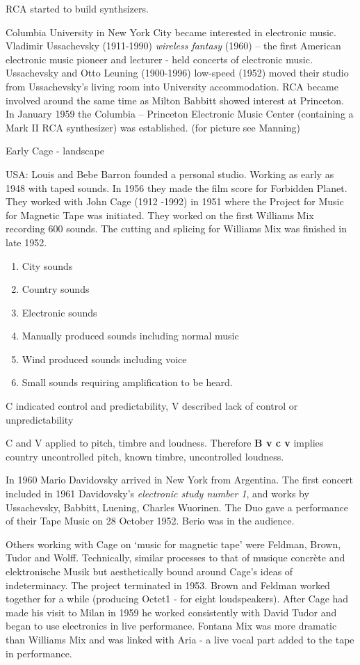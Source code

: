 RCA started to build synthsizers.

Columbia University in New York City became interested in electronic music. Vladimir Ussachevsky (1911-1990) \textit{wireless fantasy} (1960) – the first American electronic music pioneer and lecturer - held concerts of electronic music. Ussachevsky and Otto Leuning (1900-1996) low-speed (1952) moved their studio from Ussachevsky’s living room into University accommodation. RCA became involved around the same time as Milton Babbitt showed interest at Princeton. In January 1959 the Columbia – Princeton Electronic Music Center (containing a Mark II RCA synthesizer) was established. (for picture see Manning)

Early Cage - landscape

USA: Louis and Bebe Barron founded a personal studio. Working as early as 1948 with taped sounds. In 1956 they made the film score for Forbidden Planet. They worked with John Cage (1912 -1992) in 1951 where the Project for Music for Magnetic Tape was initiated. They worked on the first Williams Mix recording 600 sounds. The cutting and splicing for Williams Mix was finished in late 1952.
\begin{enumerate}[a]
\item City sounds
\item Country sounds
\item Electronic sounds
\item Manually produced sounds including normal music
\item Wind produced sounds including voice
\item Small sounds requiring amplification to be heard.
\end{enumerate}

C indicated control and predictability, V described lack of control or unpredictability

C and V applied to pitch, timbre and loudness. Therefore \textbf{B v c v} implies country uncontrolled pitch, known timbre, uncontrolled loudness.


In 1960 Mario Davidovsky arrived in New York from Argentina. The first concert included in 1961 Davidovsky's \textit{electronic study number 1}, and works by Ussachevsky, Babbitt, Luening, Charles Wuorinen. The Duo gave a performance of their Tape Music on 28 October 1952. Berio was in the audience.

Others working with Cage on `music for magnetic tape' were Feldman, Brown, Tudor and Wolff. Technically, similar processes to that of musique concr\`ete and elektronische Musik but aesthetically bound around Cage's ideas of indeterminacy. The project terminated in 1953. Brown and Feldman worked together for a while (producing Octet1 - for eight loudspeakers). After Cage had made his visit to Milan in 1959 he worked consistently with David Tudor and began to use electronics in live performance. Fontana Mix was more dramatic than Williams Mix and was linked with Aria - a live vocal part added to the tape in performance.

